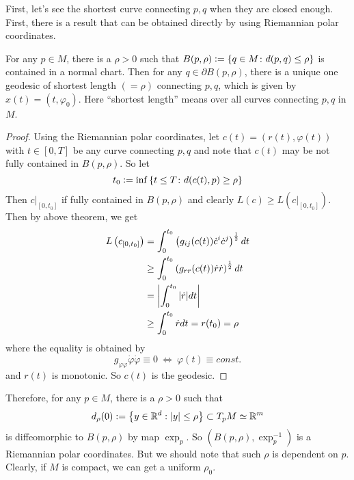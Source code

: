 First, let's see the shortest curve connecting $p,q$ when they are closed enough. First, there is a result that can be obtained directly by using Riemannian polar coordinates.
\begin{cor}
	For any $p \in M$, there is a $\rho > 0$ such that $B(p,\rho) \vcentcolon= \left\{q \in M \colon d(p,q) \leq \rho\right\}$ is contained in a normal chart. Then for any $q \in \partial B(p,\rho)$, there is a unique one geodesic of shortest length $(=\rho)$ connecting $p,q$, which is given by $x(t) = (t,\varphi_0)$. Here ``shortest length'' means over all curves connecting $p,q$ in $M$.
\end{cor}
\begin{proof}
	Using the Riemannian polar coordinates, let $c(t) = (r(t),\varphi(t))$ with $t \in [0,T]$ be any curve connecting $p,q$ and note that $c(t)$ may be not fully contained in $B(p,\rho)$. So let
	\begin{equation*}
		t_0 \vcentcolon= \inf\left\{t \leq T \colon d(c(t),p) \geq \rho\right\}
	\end{equation*}
	Then $c|_{[0,t_0]}$ if fully contained in $B(p,\rho)$ and clearly $L(c) \geq L(c|_{[0,t_0]})$. Then by above theorem, we get
	\begin{equation*}
		\begin{aligned}
			L\left(c_{\left[0, t_0\right]}\right) & =\int_0^{t_0}\left(g_{i j}(c(t)) \dot{c}^i \dot{c}^j\right)^{\frac{1}{2}} d t \\
			& \geq \int_0^{t_0}\left(g_{r r}(c(t)) \dot{r} \dot{r}\right)^{\frac{1}{2}} d t \\
			&= \left\lvert\int_0^{t_0}|\dot{r}| d t\right\lvert \\
			&\geq \int_0^{t_0} \dot{r} d t = r(t_0) = \rho
		\end{aligned}
	\end{equation*}
	where the equality is obtained by
	\begin{equation*}
	 	g_{\varphi \varphi} \dot{\varphi} \dot{\varphi} \equiv 0~\Leftrightarrow~\varphi(t)\equiv const.
	\end{equation*}
	and $r(t)$ is monotonic. So $c(t)$ is the geodesic.
\end{proof}
\begin{rmk}
	Therefore, for any $p \in M$, there is a $\rho > 0$ such that
	\begin{equation*}
		d_\rho(0):=\left\{y \in \mathbb{R}^d:|y| \leq \rho\right\} \subset T_p M\simeq \mathbb{R}^m
	\end{equation*}
	is diffeomorphic to $B(p,\rho)$ by map $\exp_p$. So $(B(p,\rho),\exp_p^{-1})$ is a Riemannian polar coordinates. But we should note that such $\rho$ is dependent on $p$. Clearly, if $M$ is compact, we can get a uniform $\rho_0$.
\end{rmk}

